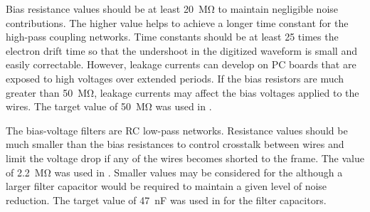 
Bias resistance values should be at least \SI{20}{\mega\ohm} to maintain negligible noise contributions.
The higher value helps to achieve a longer time constant for the high-pass coupling networks.
Time constants should be at least \num{25} times the electron drift time so that the undershoot in the digitized waveform
is small and easily correctable.
However, leakage currents can develop on PC boards that are exposed to high voltages over extended periods.
If the bias resistors are much greater than \SI{50}{\mega\ohm}, leakage currents may affect the bias voltages applied to the wires. The target value of \SI{50}{\mega\ohm} was used in .

The bias-voltage filters are RC low-pass networks.
Resistance values should be much smaller than the bias resistances to control crosstalk between wires
and limit the voltage drop if any of the wires becomes shorted to the  frame.
The value of \SI{2.2}{\mega\ohm} was used in .
Smaller values may be considered for %
the  although a larger filter capacitor would be required to maintain a given level of noise reduction.
The target value of \SI{47}{nF} was used in  for the filter capacitors.

